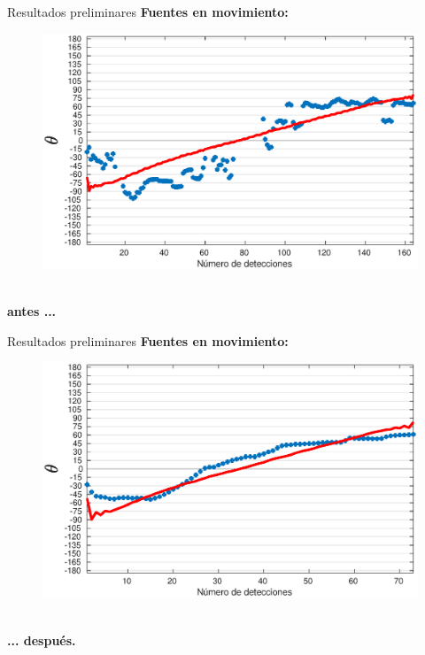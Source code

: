 \documentclass[12pt,aspectratio=169]{beamer}
\begin{document}
	\begin{frame}{Resultados preliminares}
		\textbf{Fuentes en movimiento:}
		
		\hspace{20mm}
		\begin{minipage} {105mm}
			\begin{figure}[h]
				\centering
				\includegraphics[width=\linewidth]{figures/moving1nomean}
			\end{figure}
		\end{minipage}\\
		\hspace{130mm}\textbf{antes ...}
	\end{frame}
	
	\begin{frame}{Resultados preliminares}
		\textbf{Fuentes en movimiento:}
		
		\hspace{20mm}
		\begin{minipage} {105mm}
			\begin{figure}[h]
				\centering
				\includegraphics[width=0.99\linewidth]{figures/moving130kmean10degrees}
			\end{figure}
		\end{minipage}\\
		\hspace{130mm}\textbf{... después.}
	\end{frame}
	
\end{document}
